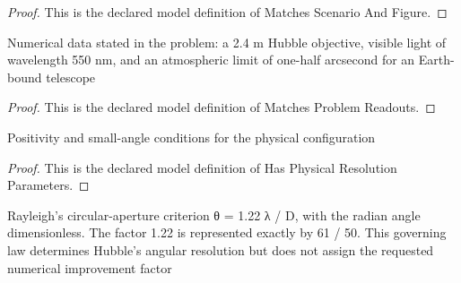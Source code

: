 \begin{proof}
  This is the declared model definition of Matches Scenario And Figure.
\end{proof}
\begin{definition}
  \label{def:physics:phyx-mini-0131:phyxminiproblems-problemphyxmini0131-matchesproblemreadouts}
  Numerical data stated in the problem: a 2.4 m Hubble objective, visible light of wavelength 550 nm, and an atmospheric limit of one-half arcsecond for an Earth-bound telescope
\end{definition}
\begin{proof}
  This is the declared model definition of Matches Problem Readouts.
\end{proof}
\begin{definition}
  \label{def:physics:phyx-mini-0131:phyxminiproblems-problemphyxmini0131-hasphysicalresolutionparameters}
  Positivity and small-angle conditions for the physical configuration
\end{definition}
\begin{proof}
  This is the declared model definition of Has Physical Resolution Parameters.
\end{proof}
\begin{definition}
  \label{def:physics:phyx-mini-0131:phyxminiproblems-problemphyxmini0131-satisfiesrayleighcriterion}
  Rayleigh's circular-aperture criterion θ = 1.22 λ / D, with the radian angle dimensionless. The factor 1.22 is represented exactly by 61 / 50. This governing law determines Hubble's angular resolution but does not assign the requested numerical improvement factor
\end{definition}
